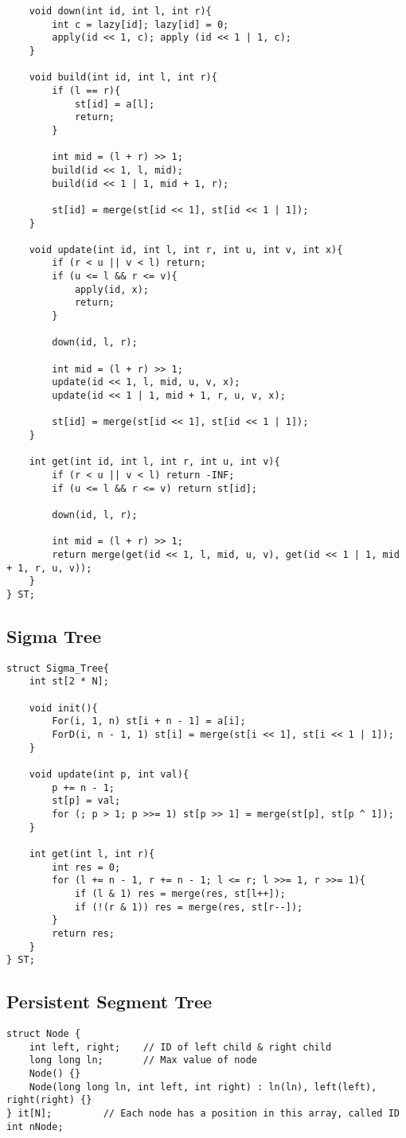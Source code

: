 \documentclass[11pt,a4paper]{article}
\begin{document}
\begin{multicols*}{2}
\begin{lstlisting}
	void down(int id, int l, int r){
		int c = lazy[id]; lazy[id] = 0;
        apply(id << 1, c); apply (id << 1 | 1, c);
	}
	
	void build(int id, int l, int r){
		if (l == r){
			st[id] = a[l];
			return;
		}
		
		int mid = (l + r) >> 1;
		build(id << 1, l, mid);
		build(id << 1 | 1, mid + 1, r);
		
		st[id] = merge(st[id << 1], st[id << 1 | 1]);
	}
	
	void update(int id, int l, int r, int u, int v, int x){
		if (r < u || v < l) return;
		if (u <= l && r <= v){
			apply(id, x);
			return;
		}
		
		down(id, l, r);
		
		int mid = (l + r) >> 1;
		update(id << 1, l, mid, u, v, x);
		update(id << 1 | 1, mid + 1, r, u, v, x);
		
		st[id] = merge(st[id << 1], st[id << 1 | 1]);
	}
	
	int get(int id, int l, int r, int u, int v){
		if (r < u || v < l) return -INF;
		if (u <= l && r <= v) return st[id];
		
		down(id, l, r);
		
		int mid = (l + r) >> 1;
		return merge(get(id << 1, l, mid, u, v), get(id << 1 | 1, mid + 1, r, u, v));
	}
} ST;
\end{lstlisting}

\subsection{Sigma Tree}
\begin{lstlisting}
struct Sigma_Tree{
    int st[2 * N];
 
    void init(){
        For(i, 1, n) st[i + n - 1] = a[i];
        ForD(i, n - 1, 1) st[i] = merge(st[i << 1], st[i << 1 | 1]); 
    }
 
 	void update(int p, int val){
 		p += n - 1;
 		st[p] = val;
 		for (; p > 1; p >>= 1) st[p >> 1] = merge(st[p], st[p ^ 1]);
 	}
 	
    int get(int l, int r){
        int res = 0;
        for (l += n - 1, r += n - 1; l <= r; l >>= 1, r >>= 1){
            if (l & 1) res = merge(res, st[l++]);
            if (!(r & 1)) res = merge(res, st[r--]);
        }
        return res;
    }
} ST;
\end{lstlisting}

\subsection{Persistent Segment Tree}
\begin{lstlisting}
struct Node {
    int left, right;    // ID of left child & right child
    long long ln;       // Max value of node
    Node() {}
    Node(long long ln, int left, int right) : ln(ln), left(left), right(right) {}
} it[N];         // Each node has a position in this array, called ID
int nNode;


\end{lstlisting}
\end{multicols*}
\end{document}
